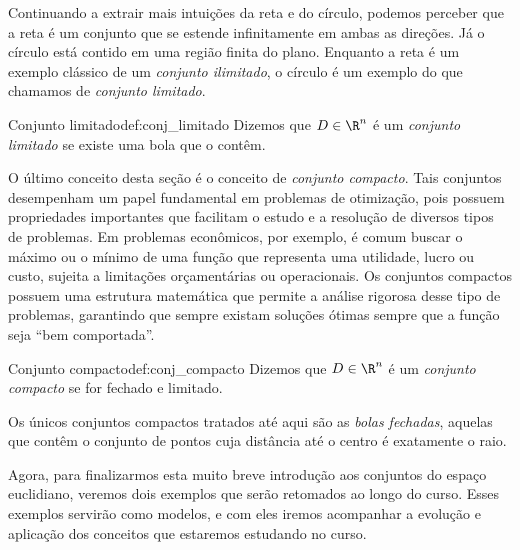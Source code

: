  


Continuando a extrair mais intuições da reta e do círculo, podemos perceber que a reta é um conjunto que se estende infinitamente em ambas as direções. Já o círculo está contido em uma região finita do plano. Enquanto a reta é um exemplo clássico de um \textit{conjunto ilimitado}, o círculo é um exemplo do que chamamos de \textit{conjunto limitado}.
\begin{definition}{Conjunto limitado}{def:conj_limitado}
Dizemos que $D\in\R^n$ é um \textit{conjunto limitado} se existe uma bola que o contêm.    
\end{definition}

O último conceito desta seção é o conceito de \textit{conjunto compacto}. Tais conjuntos desempenham um papel fundamental em problemas de otimização, pois possuem propriedades importantes que facilitam o estudo e a resolução de diversos tipos de problemas. Em problemas econômicos, por exemplo, é comum buscar o máximo ou o mínimo de uma função que representa uma utilidade, lucro ou custo, sujeita a limitações orçamentárias ou operacionais. Os conjuntos compactos possuem  uma estrutura matemática que permite a análise rigorosa desse tipo de  problemas, garantindo que sempre existam soluções ótimas sempre que a função seja ``bem comportada''. 

\begin{definition}{Conjunto compacto}{def:conj_compacto}
Dizemos que $D\in\R^n$ é um \textit{conjunto compacto} se for fechado e limitado. 
\end{definition}
Os únicos conjuntos compactos tratados até aqui são as \textit{bolas fechadas}, aquelas que contêm o conjunto de pontos cuja distância até o centro é exatamente o raio.  

Agora, para finalizarmos esta muito breve introdução aos conjuntos do espaço euclidiano, veremos dois exemplos que serão retomados ao longo do curso. Esses exemplos servirão como modelos, e com eles iremos acompanhar a evolução e aplicação dos conceitos que estaremos estudando no curso. %

